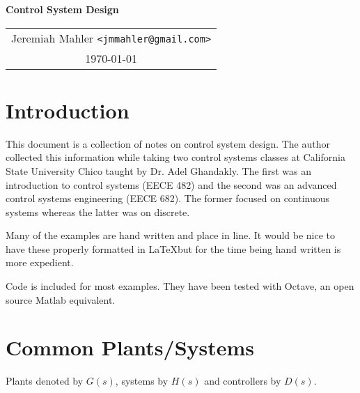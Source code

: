 \documentclass{article}
\begin{document}

\vspace*{0.5in}

\centerline{\LARGE \textbf{Control System Design}}
\vspace{0.2in}

\begin{center}
\begin{tabular}{c}
Jeremiah Mahler \texttt{<jmmahler@gmail.com>} \\
\today
\end{tabular}
\end{center}

\thispagestyle{empty}
\vfill
\pagebreak


\tableofcontents

\clearpage

\section{Introduction}

This document is a collection of notes on control system design.
The author collected this information while taking two control systems
classes at California State University Chico taught by Dr. Adel Ghandakly.
The first was an introduction to control systems (EECE 482) and
the second was an advanced control systems engineering (EECE 682).
The former focused on continuous systems whereas the latter was on
discrete.

Many of the examples are hand written and place in line.
It would be nice to have these properly formatted in \LaTeX but
for the time being hand written is more expedient.

Code is included for most examples.
They have been tested with Octave\autocite{octave},
an open source Matlab equivalent.

\clearpage
\section{Common Plants/Systems}

\nocite{ogata1995discrete}
\nocite{franklin1998digital}

Plants denoted by $G(s)$, systems by $H(s)$ and controllers by $D(s)$.
\end{document}
